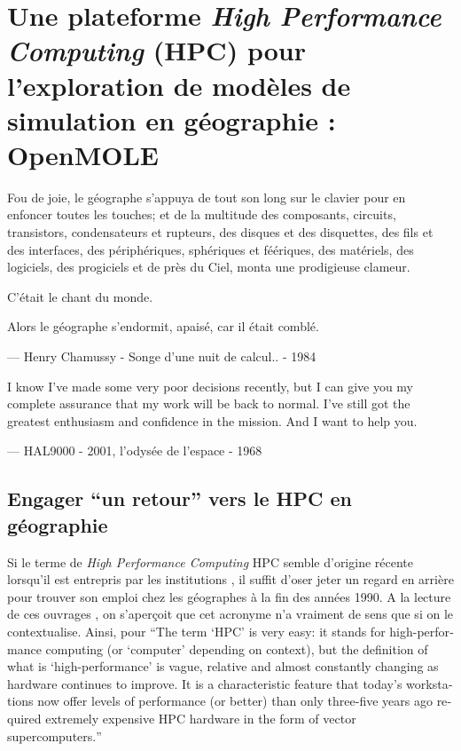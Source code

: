 
\newcommand\litem[1]{\item{\bfseries #1,\enspace}}

\section{Une plateforme \textit{High Performance Computing} (HPC) pour l'exploration de modèles de simulation en géographie : OpenMOLE}
\label{sec:retourgeoHPCopenmole}

\epigraph {Fou de joie, le géographe s'appuya de tout son long sur le clavier pour en enfoncer toutes les touches; et de la multitude des composants, circuits, transistors, condensateurs et rupteurs, des disques et des disquettes, des fils et des interfaces, des périphériques, sphériques et féériques, des matériels, des logiciels, des progiciels et de près du Ciel, monta une prodigieuse clameur.

C'était le chant du monde.

Alors le géographe s'endormit, apaisé, car il était comblé.}{ --- \textup{Henry Chamussy - Songe d'une nuit de calcul.. - 1984}}

\epigraph {I know I've made some very poor decisions recently, but I can give you my complete assurance that my work will be back to normal. I've still got the greatest enthusiasm and confidence in the mission. And I want to help you.}{ --- \textup{HAL9000 - 2001, l'odysée de l'espace  - 1968}}

\subsection{Engager \enquote{un retour} vers le HPC en géographie}
\label{ssec:retourHPC}

Si le terme de \textit{High Performance Computing} HPC semble d'origine récente lorsqu'il est entrepris par les institutions \autocite{HPCHorizon2020}, il suffit d'oser jeter un regard en arrière pour trouver son emploi chez les géographes à la fin des années 1990. A la lecture de ces ouvrages \autocites{Turton1998, Openshaw2000, Openshaw2000b}, on s'aperçoit que cet acronyme n'a vraiment de sens que si on le contextualise. Ainsi, pour \textcite{Openshaw2000} \foreignquote{english}{The term \enquote{HPC} is very easy: it stands for high-performance computing (or \enquote{computer} depending on context), but the definition of what is \enquote{high-performance} is vague, relative and almost constantly changing as hardware continues to improve. It is a characteristic feature that today's workstations now offer levels of performance (or better) than only three-five years ago required extremely expensive HPC hardware in the form of vector supercomputers.}

